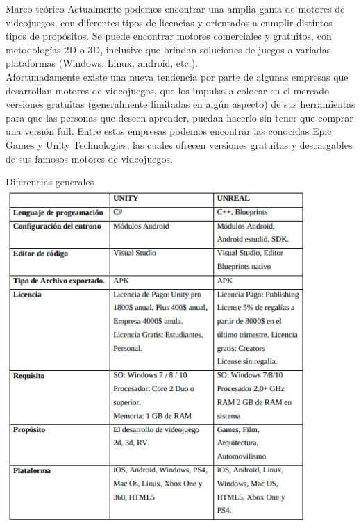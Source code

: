 \begin{thesischapter}{1} {Marco teórico}
    Actualmente podemos encontrar una amplia gama de motores de videojuegos, con diferentes tipos de
    licencias y orientados a cumplir distintos tipos de propósitos. Se puede encontrar motores comerciales
    y gratuitos, con metodologías 2D o 3D, inclusive que brindan soluciones de juegos a variadas
    plataformas (Windows, Linux, android, etc.).\\ 
    Afortunadamente existe una nueva tendencia por parte de algunas empresas que desarrollan motores de 
    videojuegos, que los impulsa a colocar en el mercado versiones gratuitas (generalmente limitadas en 
    algún aspecto) de sus herramientas para que las personas que deseen aprender, puedan hacerlo sin tener 
    que comprar una versión full. Entre estas empresas podemos encontrar las conocidas Epic Games
    y Unity Technologies, las cuales ofrecen versiones gratuitas y descargables de sus famosos motores de videojuegos.~\cite{arce2011desarrollo} 
    
    \begin{center}
        Diferencias generales ~\cite{chavez2021diferencias}\\
        \includegraphics[height=5in]{images/unityvsunreal.png}
    \end{center}
    

\end{thesischapter}
